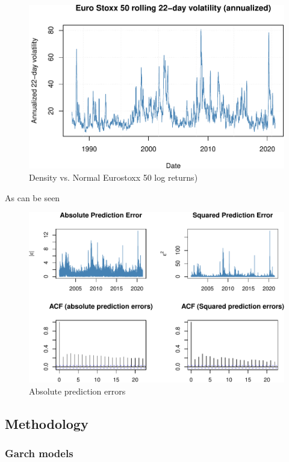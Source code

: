\documentclass[a4paper, twoside]{templates/ociamthesis}
\begin{document}
\begin{figure}

{\centering \includegraphics[width=0.75\linewidth]{_main_files/figure-latex/plot3-1} 

}

\caption{Density vs. Normal Eurostoxx 50 log returns)}\label{fig:plot3}
\end{figure}

As can be seen

\begin{figure}

{\centering \includegraphics[width=0.75\linewidth]{_main_files/figure-latex/acfplots-1} 

}

\caption{Absolute prediction errors}\label{fig:acfplots}
\end{figure}

\newpage

\hypertarget{methodology}{%
\subsection{Methodology}\label{methodology}}

\hypertarget{garch-models}{%
\subsubsection{Garch models}\label{garch-models}}
\end{document}
